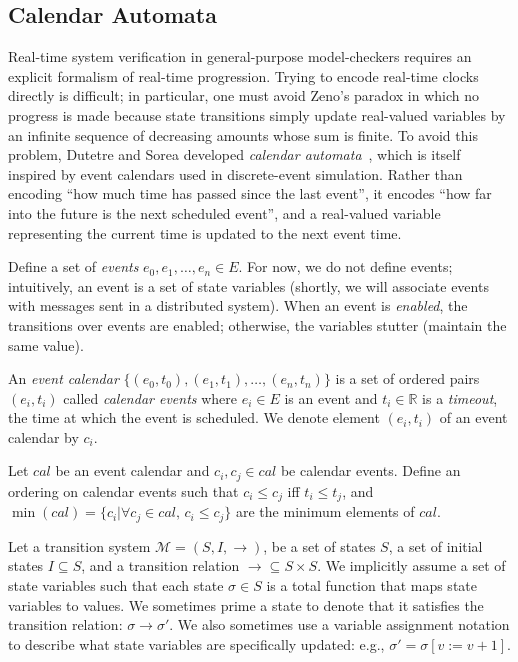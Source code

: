 \documentclass{llncs/llncs}
\begin{document}
\subsection{Calendar Automata}\label{sec:calendar}

Real-time system verification in general-purpose model-checkers requires an explicit formalism of real-time progression. Trying to encode real-time clocks directly is difficult; in particular, one must avoid Zeno's paradox in which no progress is made because state transitions simply update real-valued variables by an infinite sequence of decreasing amounts whose sum is finite. To avoid this problem, Dutetre and Sorea developed \emph{calendar automata}~\cite{cal}, which is itself inspired by event calendars used in discrete-event simulation. Rather than encoding ``how much time has passed since the last event'', it encodes ``how far into the future is the next scheduled event'', and a real-valued variable representing the current time is updated to the next event time.

Define a set of \emph{events} $e_0, e_1, \ldots, e_n \in E$. For now, we do not define events; intuitively, an event is a set of state variables (shortly, we will associate events with messages sent in a distributed system). When an event is \emph{enabled}, the transitions over events are enabled; otherwise, the variables stutter (maintain the same value).

An \emph{event calendar} $\{ (e_0, t_0), (e_1, t_1), \ldots, (e_n, t_n) \}$ is a set of ordered pairs $(e_i, t_i)$ called \emph{calendar events} where $e_i \in E$ is an event and $t_i \in \mathbb{R}$ is a \emph{timeout}, the time at which the event is scheduled. We denote element $(e_i, t_i)$ of an event calendar by $c_i$.

Let $cal$ be an event calendar and $c_i, c_j \in cal$ be calendar events. Define an ordering on calendar events such that $c_i \leq c_j$ iff $t_i \leq t_j$, and $\min(cal) = \{ c_i | \forall c_j \in cal, \, c_i \leq c_j  \}$ are the minimum elements of $cal$.

Let a transition system $\mathcal{M} = (S, I, \rightarrow)$, be a set of states $S$, a set of initial states $I \subseteq S$, and a transition relation $\rightarrow \subseteq S \times S$. We implicitly assume a set of state variables such that each state $\sigma \in S$ is a total function that maps state variables to values. We sometimes prime a state to denote that it satisfies the transition relation: $\sigma \rightarrow \sigma'$. We also sometimes use a variable assignment notation to describe what state variables are specifically updated: e.g., $\sigma' = \sigma[v := v+1]$.
\end{document}
